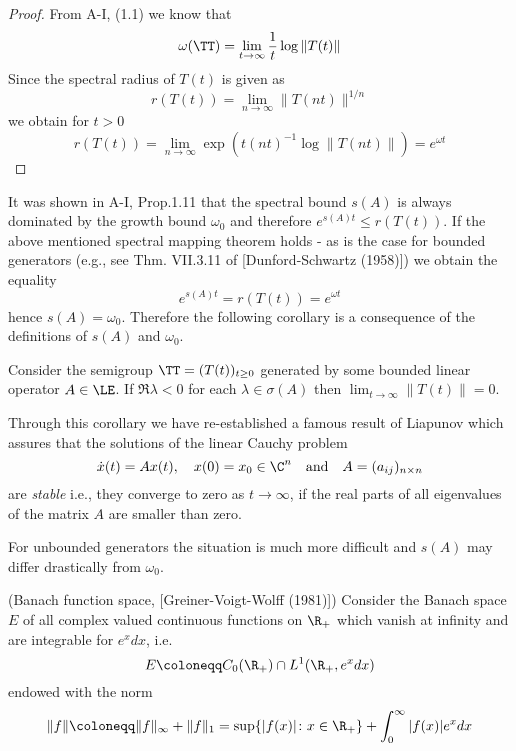 \begin{proof}
From A-I, (1.1) we know that
\[ 
    \omega(\TT) = \lim_{t \to \infty} \frac{1}{t} \log \|T(t)\|
\]
Since the spectral radius of $T(t)$ is given as
\[
    r(T(t)) = \lim_{n \to \infty} \|T(nt)\|^{1/n}
\]
we obtain for $t > 0$
\[
    r(T(t)) = \lim_{n \to \infty} \exp(t(nt)^{-1} \log \|T(nt)\|) = e^{\omega t}
\]
\end{proof}
It was shown in A-I, Prop.1.11 that the spectral bound $s(A)$ is always dominated by the growth bound $\omega_{0}$ and therefore $e^{s(A)t} \leq r(T(t))$.
If the above mentioned spectral mapping theorem holds - as is the case for bounded generators (e.g., see Thm. VII.3.11 of [Dunford-Schwartz (1958)]) we obtain the equality
\[
    e^{s(A)t} = r(T(t)) = e^{\omega t}
\]
hence $s(A) = \omega_{0}$.
Therefore the following corollary is a consequence of the definitions of $s(A)$ and $\omega_{0}$.
\begin{corollary}\label{cor:a3-1.2}
Consider the semigroup $\TT = (T(t))_{t \geq 0}$ generated by some bounded linear operator $A \in \LE$.
If $\Re\lambda < 0$ for each $\lambda \in \sigma(A)$ then $\lim_{t \to \infty}\|T(t)\| = 0$.
\end{corollary}
Through this corollary we have re-established a famous result of Liapunov which assures that the solutions of the linear Cauchy problem
\[
    \dot{x}(t) = Ax(t), \quad x(0) = x_{0} \in \C^{n} \quad \text{and} \quad A = (a_{ij})_{n\times n}
\]
are \emph{stable} i.e., they converge to zero as $t \to \infty$, if the real parts of all eigenvalues of the matrix $A$ are smaller than zero.

For unbounded generators the situation is much more difficult and $s(A)$ may differ drastically from $\omega_{0}$.
\begin{example}\label{ex:a3-1.3}
(Banach function space, [Greiner-Voigt-Wolff (1981)])
Consider the Banach space $E$ of all complex valued continuous functions on $\R_{+}$ which vanish at infinity and are integrable for $e^{x}dx$, i.e.
\[
    E \coloneqq C_{0}(\R_{+}) \cap L^{1}(\R_{+}, e^{x}dx)
\]
endowed with the norm
\[
    \|f\| \coloneqq \|f\|_{\infty} + \|f\|_{1} = \sup\{|f(x)| \colon x \in \R_{+}\} + \int_{0}^{\infty} |f(x)|e^{x} dx
\]
\end{example}

\newpage

